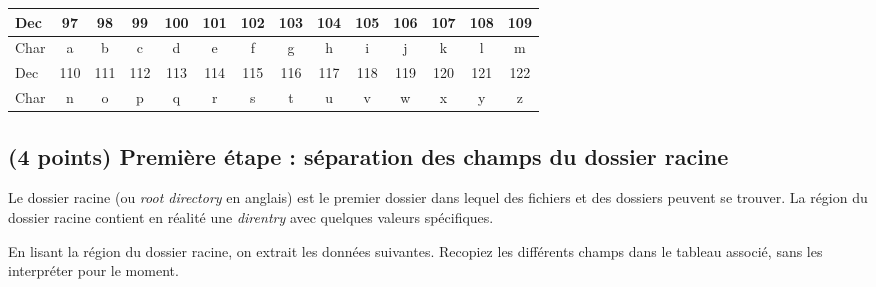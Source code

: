 \documentclass[11pt,a4paper]{article}
\begin{document}
\begin{center}
\begin{tabular}{ | l |c|c|c|c|c|c|c|c|c|c|c|c|c| }
\hline
Dec &  97 & 98 & 99 & 100 & 101 & 102 & 103 & 104 & 105 & 106 & 107 & 108 & 109 \\
\hline
Char &  a &  b &  c &  d  &  e  &  f  &  g  &  h  &  i  &  j  &  k  &  l  &  m \\
\hline
%
%
\hline
Dec &  110 & 111 & 112 & 113 & 114 & 115 & 116 & 117 & 118 & 119 & 120 & 121 & 122 \\
\hline
Char &  n  &  o  &  p  &  q  &  r  &  s  &  t  &  u  &  v  &  w  &  x  &  y  &  z \\
\hline
\end{tabular}

\end{center}



\subsection{(4 points) Première étape : séparation des champs du dossier racine }

Le dossier racine (ou \textit{root directory} en anglais) est le premier dossier dans lequel des fichiers et des dossiers peuvent se trouver.
La région du dossier racine contient en réalité une \textit{direntry} avec quelques valeurs spécifiques.

\medskip

En lisant la région du dossier racine, on extrait les données suivantes.
Recopiez les différents champs dans le tableau associé, sans les interpréter pour le moment.
\end{document}
